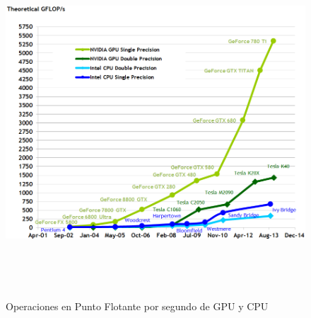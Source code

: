\begin{figure}[H]
			\centering
				\includegraphics[height=13cm]{img/flops.png}
			\caption{Operaciones en Punto Flotante por segundo de GPU y CPU \cite{Flops}}
\end{figure}